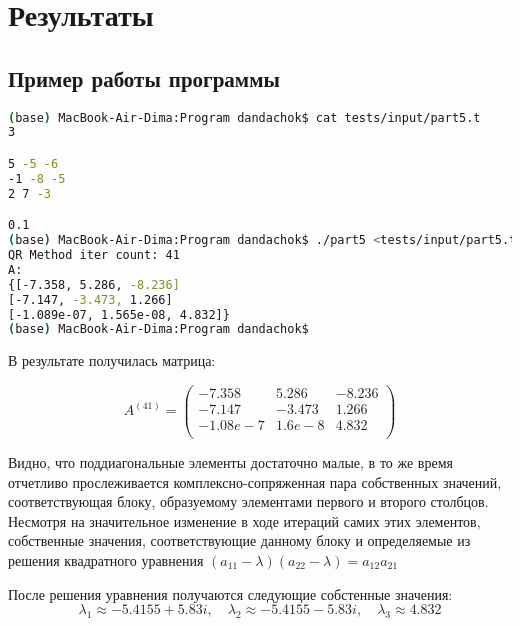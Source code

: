 \section*{Результаты}

\subsection*{Пример работы программы}

\begin{lstlisting}[language=bash]
(base) MacBook-Air-Dima:Program dandachok$ cat tests/input/part5.t
3

5 -5 -6
-1 -8 -5
2 7 -3

0.1
(base) MacBook-Air-Dima:Program dandachok$ ./part5 <tests/input/part5.t
QR Method iter count: 41
A:
{[-7.358, 5.286, -8.236]
[-7.147, -3.473, 1.266]
[-1.089e-07, 1.565e-08, 4.832]}
(base) MacBook-Air-Dima:Program dandachok$
\end{lstlisting}
В результате получилась матрица:

$$A^{(41)}=
\begin{pmatrix}
    -7.358 & 5.286 & -8.236 \\
    -7.147 & -3.473 & 1.266 \\
    -1.08e-7 & 1.6e-8 & 4.832 \\
\end{pmatrix}$$

Видно, что поддиагональные элементы
достаточно малые, в то же время отчетливо прослеживается
комплексно-сопряженная пара собственных значений, соответствующая
блоку, образуемому элементами первого и
второго столбцов. Несмотря на значительное изменение в ходе
итераций самих этих элементов, собственные значения, соответствующие
данному блоку и определяемые из решения квадратного уравнения
$(a_{11} - \lambda)(a_{22} - \lambda)=a_{12}a_{21}$

После решения уравнения получаются следующие собстенные значения:
$$\lambda_1 \approx -5.4155 + 5.83i,\quad
\lambda_2 \approx -5.4155 - 5.83i,\quad
\lambda_3 \approx 4.832$$

\pagebreak